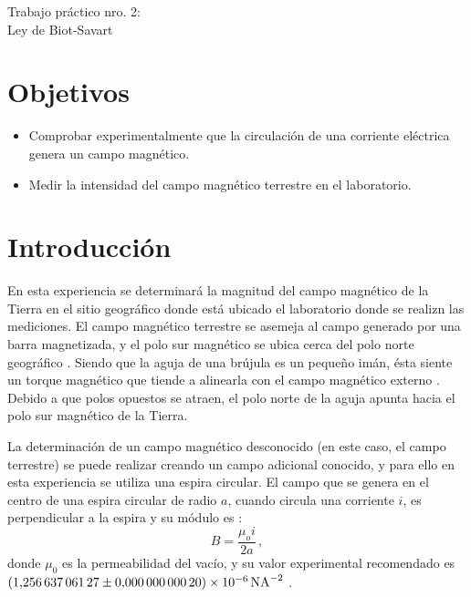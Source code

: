 \documentclass[a4paper,12pt]{article}
\begin{document}
\thispagestyle{fancy}

\vspace*{10pt}

\begin{center}
    \LARGE Trabajo práctico nro. 2: \\[10pt]
    \LARGE Ley de Biot-Savart
\end{center}
    
\vspace{20pt}

\section*{Objetivos}

\begin{itemize}
\item Comprobar experimentalmente que la circulación de una corriente eléctrica genera un campo magnético.
\item Medir la intensidad del campo magnético terrestre en el laboratorio.
\end{itemize}

\section*{Introducción}

En esta experiencia se determinará la magnitud del campo magnético de la Tierra en el sitio geográfico donde está ubicado el laboratorio donde se realizn las mediciones. El campo magnético terrestre se asemeja al campo generado por una barra magnetizada, y el polo sur magnético se ubica cerca del polo norte geográfico \cite[pp.~883-885]{young_freedman_2013}. Siendo que la aguja de una brújula es un pequeño imán, ésta siente un torque magnético que tiende a alinearla con el campo magnético externo \cite[p.~903]{young_freedman_2013}. Debido a que polos opuestos se atraen, el polo norte de la aguja apunta hacia el polo sur magnético de la Tierra.\par\medskip

La determinación de un campo magnético desconocido (en este caso, el campo terrestre) se puede realizar creando un campo adicional conocido, y para ello en esta experiencia se utiliza una espira circular. El campo que se genera en el centro de una espira circular de radio $a$, cuando circula una corriente $i$, es perpendicular a la espira y su módulo es \cite[pp.~933-934]{young_freedman_2013}:
\begin{equation}\label{Bespira}
B = \frac{\mu_o i}{2a}\, ,
\end{equation}
donde $\mu_0$ es la permeabilidad del vacío, y su valor experimental recomendado es $\SI{1.25663706127(20)E-6}{NA^{-2}}$ \cite{nist_mu0_2022}.\par\medskip
\end{document}

